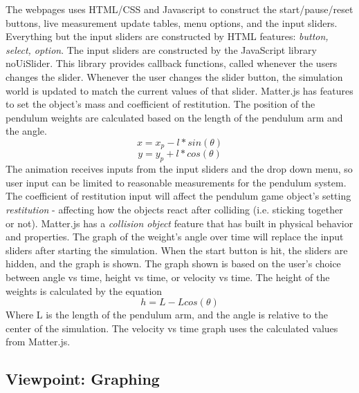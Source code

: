 The webpages uses HTML/CSS and Javascript to construct the start/pause/reset buttons, live measurement update tables, menu options, and the input sliders. Everything but the input sliders are constructed by HTML features: \textit{button, select, option}. 
The input sliders are constructed by the JavaScript library noUiSlider. This library provides callback functions, called whenever the users changes the slider. Whenever the user changes the slider button, the simulation world is updated to match the current values of that slider. Matter.js has features to set the object's mass and coefficient of restitution. The position of the pendulum weights are calculated based on the length of the pendulum arm and the angle. 
\begin{equation}
    x = x_p - l*sin(\theta)
\end{equation}
\begin{equation}
    y = y_p + l*cos(\theta)
\end{equation}
The animation receives inputs from the input sliders and the drop down menu, so user input can be limited to reasonable measurements for the pendulum system. The coefficient of restitution input will affect the pendulum game object's setting \textit{restitution} - affecting how the objects react after colliding (i.e. sticking together or not). Matter.js has a \textit{collision object} feature that has built in physical behavior and properties. 
\newline The graph of the weight's angle over time will replace the input sliders after starting the simulation. When the start button is hit, the sliders are hidden, and the graph is shown. The graph shown is based on the user's choice between angle vs time, height vs time, or velocity vs time.
The height of the weights is calculated by the equation 
\begin{equation}
    h = L - Lcos(\theta)
\end{equation}
Where L is the length of the pendulum arm, and the angle is relative to the center of the simulation.
The velocity vs time graph uses the calculated values from Matter.js. 



\subsection{Viewpoint: Graphing}

